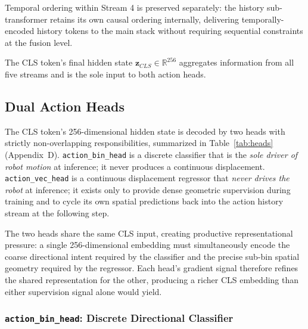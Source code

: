 \documentclass[letterpaper]{article} %
\begin{document}
Temporal ordering within Stream 4 is preserved separately: the history sub-transformer retains its own causal ordering internally, delivering temporally-encoded history tokens to the main stack without requiring sequential constraints at the fusion level.

The CLS token's final hidden state $\mathbf{z}_{CLS} \in \mathbb{R}^{256}$ aggregates information from all five streams and is the sole input to both action heads.

\subsection{Dual Action Heads}

The CLS token's 256-dimensional hidden state is decoded by two heads with strictly non-overlapping responsibilities, summarized in Table~\ref{tab:heads} (Appendix~D). \texttt{action\_bin\_head} is a discrete classifier that is the \emph{sole driver of robot motion} at inference; it never produces a continuous displacement. \texttt{action\_vec\_head} is a continuous displacement regressor that \emph{never drives the robot} at inference; it exists only to provide dense geometric supervision during training and to cycle its own spatial predictions back into the action history stream at the following step.

The two heads share the same CLS input, creating productive representational pressure: a single 256-dimensional embedding must simultaneously encode the coarse directional intent required by the classifier and the precise sub-bin spatial geometry required by the regressor. Each head's gradient signal therefore refines the shared representation for the other, producing a richer CLS embedding than either supervision signal alone would yield.

\subsubsection{\texttt{action\_bin\_head}: Discrete Directional Classifier}
\end{document}
